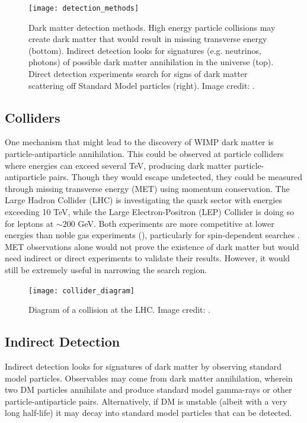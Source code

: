 \begin{figure}
\centering
\texttt{[image: detection\_methods]}
\caption[Dark matter detection methods.  Image credit: .]{Dark matter detection methods.  High energy
particle collisions may create dark matter that would result in missing transverse
energy (bottom).  Indirect detection looks for signatures (e.g. neutrinos, photons) of possible dark matter annihilation in the
universe (top).  Direct detection experiments search for signs of dark matter scattering off Standard Model particles (right).  Image
credit: .}
\label{fig:detection_methods}
\end{figure}

\subsection{Colliders} \label{subsec:colliders}
One mechanism that might lead to the discovery of WIMP dark matter is particle-antiparticle
annihilation.  This could be observed at particle colliders where energies can exceed
several TeV, producing dark matter particle-antiparticle pairs.  Though they would escape undetected, they could be measured through
missing transverse energy (MET) using momentum conservation.  The
Large Hadron Collider (LHC) is investigating the quark sector with energies
exceeding 10 TeV, while the Large Electron-Positron (LEP) Collider is doing so for leptons at
${\sim} 200$ GeV.  Both experiments are more competitive at lower energies than noble gas experiments (),
particularly for spin-dependent searches .  MET observations alone would not prove the existence of dark
matter but would need
indirect or direct experiments to validate their results.  However, it would still be extremely useful in narrowing the search region.

\begin{figure}
\centering
\texttt{[image: collider\_diagram]}
\caption{Diagram of a collision at the LHC.  Image credit: .}
\label{fig:collider}
\end{figure}


\subsection{Indirect Detection} \label{subsec:indirect}
Indirect detection looks for signatures of dark matter by observing standard model particles.  Observables
may come from dark matter annihilation, wherein two DM particles annihilate and produce standard model
gamma-rays or other particle-antiparticle pairs.  Alternatively, if DM is unstable (albeit with a very long half-life) it may decay into
standard model particles that can be detected.

